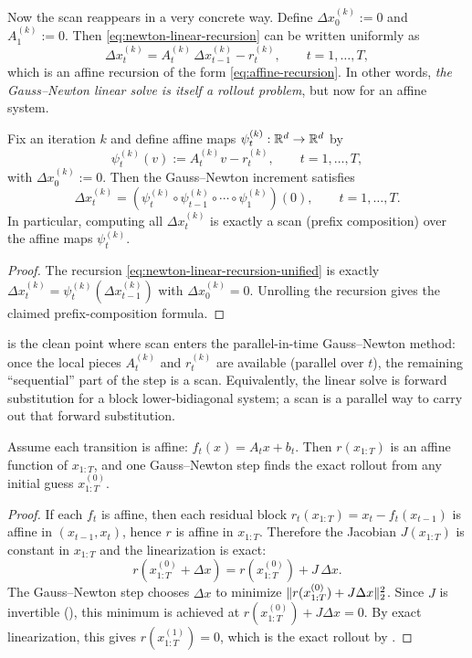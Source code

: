 \documentclass[11pt]{article}
\begin{document}
Now the scan reappears in a very concrete way.
Define $\Delta x_0^{(k)}:=0$ and $A_1^{(k)}:=0$.
Then \eqref{eq:newton-linear-recursion} can be written uniformly as
\begin{equation}
  \Delta x_t^{(k)} = A_t^{(k)}\,\Delta x_{t-1}^{(k)} - r_t^{(k)},
  \qquad t=1,\dots,T,
  \label{eq:newton-linear-recursion-unified}
\end{equation}
which is an affine recursion of the form \eqref{eq:affine-recursion}.
In other words, \emph{the Gauss--Newton linear solve is itself a rollout problem}, but now for an affine system.

\begin{proposition}
\label{prop:newton-scan}
Fix an iteration $k$ and define affine maps $\psi_t^{(k)}:\mathbb{R}^d\to\mathbb{R}^d$ by
\[
\psi_t^{(k)}(v) := A_t^{(k)}v - r_t^{(k)},
\qquad t=1,\dots,T,
\]
with $\Delta x_0^{(k)}:=0$.
Then the Gauss--Newton increment satisfies
\[
\Delta x_t^{(k)} = (\psi_t^{(k)}\circ\psi_{t-1}^{(k)}\circ\cdots\circ\psi_1^{(k)})(0),
\qquad t=1,\dots,T.
\]
In particular, computing all $\Delta x_t^{(k)}$ is exactly a scan (prefix composition) over the affine maps $\psi_t^{(k)}$.
\end{proposition}
\begin{proof}
The recursion \eqref{eq:newton-linear-recursion-unified} is exactly $\Delta x_t^{(k)}=\psi_t^{(k)}(\Delta x_{t-1}^{(k)})$ with $\Delta x_0^{(k)}=0$.
Unrolling the recursion gives the claimed prefix-composition formula.%
\end{proof}

 is the clean point where scan enters the parallel-in-time Gauss--Newton method:
once the local pieces $A_t^{(k)}$ and $r_t^{(k)}$ are available (parallel over $t$), the remaining ``sequential'' part of the step is a scan.
Equivalently, the linear solve is forward substitution for a block lower-bidiagonal system; a scan is a parallel way to carry out that forward substitution.

\begin{proposition}
\label{prop:affine-one-newton-step}
Assume each transition is affine: $f_t(x)=A_t x+b_t$.
Then $r(x_{1:T})$ is an affine function of $x_{1:T}$, and one Gauss--Newton step finds the exact rollout from any initial guess $x_{1:T}^{(0)}$.
\end{proposition}

\begin{proof}
If each $f_t$ is affine, then each residual block $r_t(x_{1:T})=x_t-f_t(x_{t-1})$ is affine in $(x_{t-1},x_t)$, hence $r$ is affine in $x_{1:T}$.
Therefore the Jacobian $J(x_{1:T})$ is constant in $x_{1:T}$ and the linearization is exact:
\[
r(x_{1:T}^{(0)}+\Delta x)=r(x_{1:T}^{(0)})+J\,\Delta x.
\]
The Gauss--Newton step chooses $\Delta x$ to minimize $\lVert r(x_{1:T}^{(0)})+J\Delta x\rVert_2^2$.
Since $J$ is invertible (), this minimum is achieved at $r(x_{1:T}^{(0)})+J\Delta x=0$.
By exact linearization, this gives $r(x_{1:T}^{(1)})=0$, which is the exact rollout by .%
\end{proof}
\end{document}
